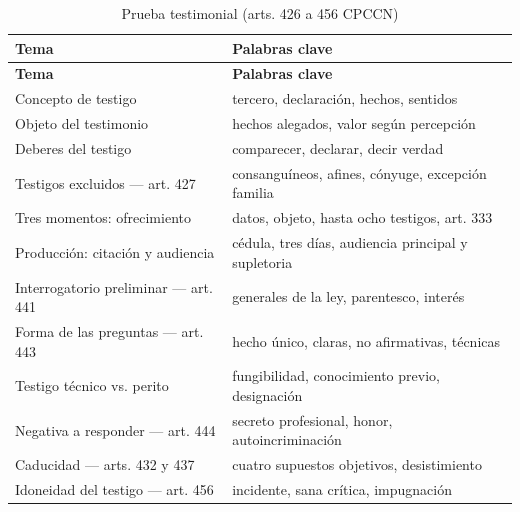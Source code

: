 \documentclass[12pt,oneside]{book}
\begin{document}
\begin{longtable}{
    >{\raggedright\arraybackslash}p{}
    >{\raggedright\arraybackslash}p{}
}
\caption{Prueba testimonial (arts. 426 a 456 CPCCN)} \\
\toprule
\textbf{Tema} & \textbf{Palabras clave} \\
\midrule
\endfirsthead
\toprule
\textbf{Tema} & \textbf{Palabras clave} \\
\midrule
\endhead
Concepto de testigo & tercero, declaración, hechos, sentidos \\
Objeto del testimonio & hechos alegados, valor según percepción \\
Deberes del testigo & comparecer, declarar, decir verdad \\
Testigos excluidos --- art. 427 & consanguíneos, afines, cónyuge, excepción familia \\
Tres momentos: ofrecimiento & datos, objeto, hasta ocho testigos, art. 333 \\
Producción: citación y audiencia & cédula, tres días, audiencia principal y supletoria \\
Interrogatorio preliminar --- art. 441 & generales de la ley, parentesco, interés \\
Forma de las preguntas --- art. 443 & hecho único, claras, no afirmativas, técnicas \\
Testigo técnico vs. perito & fungibilidad, conocimiento previo, designación \\
Negativa a responder --- art. 444 & secreto profesional, honor, autoincriminación \\
Caducidad --- arts. 432 y 437 & cuatro supuestos objetivos, desistimiento \\
Idoneidad del testigo --- art. 456 & incidente, sana crítica, impugnación \\
\bottomrule
\end{longtable}
\end{document}
